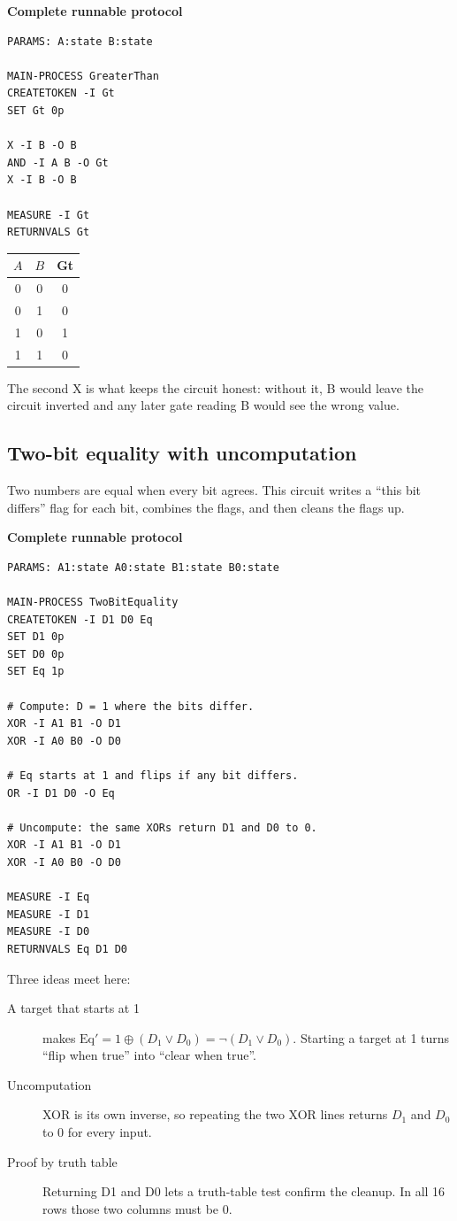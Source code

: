 \textbf{Complete runnable protocol}
\begin{lstlisting}
PARAMS: A:state B:state

MAIN-PROCESS GreaterThan
CREATETOKEN -I Gt
SET Gt 0p

X -I B -O B
AND -I A B -O Gt
X -I B -O B

MEASURE -I Gt
RETURNVALS Gt
\end{lstlisting}
\begin{center}
\begin{tabular}{cc|c}\toprule $A$&$B$&Gt\\\midrule
0&0&0\\0&1&0\\1&0&1\\1&1&0\\\bottomrule\end{tabular}
\end{center}
The second X is what keeps the circuit honest: without it, B would leave the
circuit inverted and any later gate reading B would see the wrong value.

\subsection{Two-bit equality with uncomputation}

Two numbers are equal when every bit agrees. This circuit writes a
``this bit differs'' flag for each bit, combines the flags, and then cleans the
flags up.

\textbf{Complete runnable protocol}
\begin{lstlisting}
PARAMS: A1:state A0:state B1:state B0:state

MAIN-PROCESS TwoBitEquality
CREATETOKEN -I D1 D0 Eq
SET D1 0p
SET D0 0p
SET Eq 1p

# Compute: D = 1 where the bits differ.
XOR -I A1 B1 -O D1
XOR -I A0 B0 -O D0

# Eq starts at 1 and flips if any bit differs.
OR -I D1 D0 -O Eq

# Uncompute: the same XORs return D1 and D0 to 0.
XOR -I A1 B1 -O D1
XOR -I A0 B0 -O D0

MEASURE -I Eq
MEASURE -I D1
MEASURE -I D0
RETURNVALS Eq D1 D0
\end{lstlisting}

Three ideas meet here:
\begin{description}
  \item[A target that starts at 1]  makes
  $\mathrm{Eq}'=1\oplus(D_1\lor D_0)=\neg(D_1\lor D_0)$. Starting a target
  at 1 turns ``flip when true'' into ``clear when true''.
  \item[Uncomputation] XOR is its own inverse, so repeating the two XOR lines
  returns $D_1$ and $D_0$ to 0 for every input.
  \item[Proof by truth table] Returning D1 and D0 lets a truth-table test
  confirm the cleanup. In all 16 rows those two columns must be 0.
\end{description}

